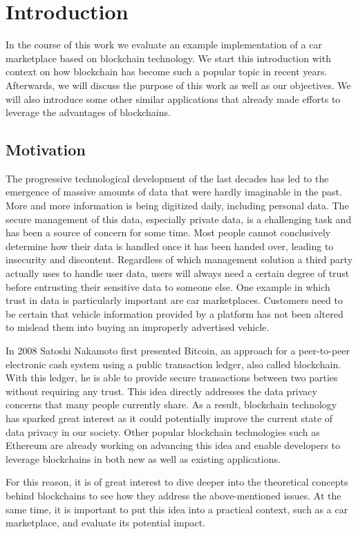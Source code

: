 \section{Introduction}
In the course of this work we evaluate an example implementation of a car marketplace based on blockchain technology. We start this introduction with context on how blockchain has become such a popular topic in recent years. Afterwards, we will discuss the purpose of this work as well as our objectives. We will also introduce some other similar applications that already made efforts to leverage the advantages of blockchains.

\subsection{Motivation}
The progressive technological development of the last decades has led to the emergence of massive amounts of data that were hardly imaginable in the past. More and more information is being digitized daily, including personal data. The secure management of this data, especially private data, is a challenging task and has been a source of concern for some time. Most people cannot conclusively determine how their data is handled once it has been handed over, leading to insecurity and discontent. Regardless of which management solution a third party actually uses to handle user data, users will always need a certain degree of trust before entrusting their sensitive data to someone else. One example in which trust in data is particularly important are car marketplaces. Customers need to be certain that vehicle information provided by a platform has not been altered to mislead them into buying an improperly advertised vehicle.

In 2008 Satoshi Nakamoto \cite{nakamoto2008bitcoin} first presented Bitcoin, an approach for a peer-to-peer electronic cash system using a public transaction ledger, also called blockchain. With this ledger, he is able to provide secure transactions between two parties without requiring any trust. This idea directly addresses the data privacy concerns that many people currently share. As a result, blockchain technology has sparked great interest as it could potentially improve the current state of data privacy in our society. Other popular blockchain technologies such as Ethereum \cite{Ethereum} are already working on advancing this idea and enable developers to leverage blockchains in both new as well as existing applications.

For this reason, it is of great interest to dive deeper into the theoretical concepts behind blockchains to see how they address the above-mentioned issues. At the same time, it is important to put this idea into a practical context, such as a car marketplace, and evaluate its potential impact.

